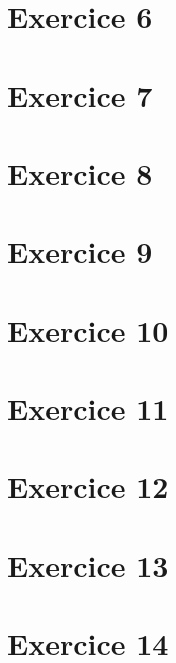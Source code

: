\documentclass[12pt]{article}
\begin{document}
\section*{Exercice 6}
\section*{Exercice 7}
\section*{Exercice 8}
\section*{Exercice 9}
\section*{Exercice 10}
\section*{Exercice 11}
\section*{Exercice 12}
\section*{Exercice 13}
\section*{Exercice 14}
\end{document}
